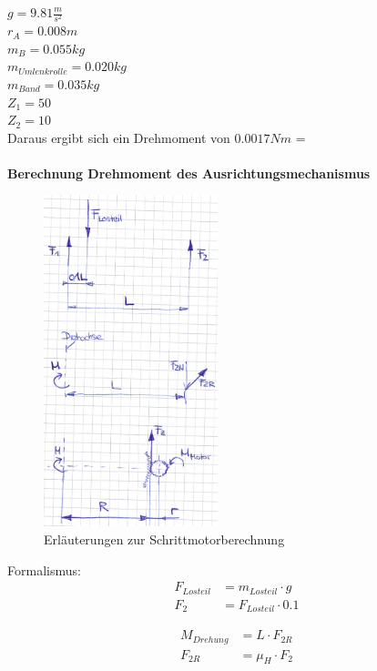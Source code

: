 $g = 9.81\frac{m}{s^2}$\\
$r_A = 0.008 m$\\
$m_B = 0.055 kg$\\
$m_{Umlenkrolle} = 0.020 kg$\\
$m_{Band} = 0.035 kg$\\
$Z_1 = 50$\\
$Z_2 = 10$\\
Daraus ergibt sich ein Drehmoment von $0.0017 Nm$ = \\
\\
\textbf{Berechnung Drehmoment des Ausrichtungsmechanismus}\\
\begin{figure}
	\centering
	\includegraphics[width=0.45\textwidth]{Enddokumentation/Anhang/Bilder/NotizBerechnungDrehmomentStepper.jpg}
	\caption{Erläuterungen zur Schrittmotorberechnung}	
\end{figure}
Formalismus:
\begin{align}
    F_{Losteil} &= m_{Losteil} \cdot g\\
    F_2 &= F_{Losteil} \cdot 0.1
\end{align}

\begin{align}
    M_{Drehung} &= L \cdot F_{2R}\\
    F_{2R} &= \mu_H \cdot F_2
\end{align}

